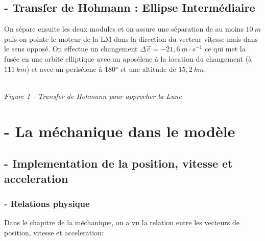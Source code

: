 \documentclass[a4paper, 12pt]{scrartcl}
\begin{document}
\subsection{- Transfer de Hohmann : Ellipse Intermédiaire}
On sépare ensuite les deux modules et on assure une séparation de au moins $10\ m$ puis on pointe
le moteur de la LM dans la direction du vecteur vitesse mais dans le sens opposé. On effectue un changement $\Delta \overrightarrow{v} = -21,6\ m\cdot s^{-1}$ 
ce qui met la fusée en une orbite elliptique avec un aposélene à la location du changement (à $111\ km$) et
avec un perisélene à 180° et une altitude de $15,2\ km$. 
\\
\begin{center}
\\
\emph{Figure 1 - Transfer de Hohmann pour approcher la Lune}
\end{center}

\section{- La méchanique dans le modèle}
\subsection{- Implementation de la position, vitesse et acceleration}
\subsubsection{- Relations physique}
Dans le chapitre de la méchanique, on a vu la relation entre les vecteurs
de position, vitesse et acceleration:
\\
\end{document}
